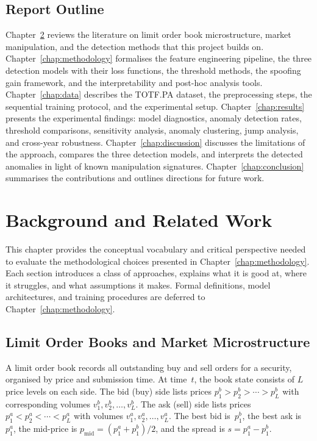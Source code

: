 \documentclass[11pt]{report}
\begin{document}
\section{Report Outline}\label{sec:intro:outline}

Chapter~\ref{chap:background} reviews the literature on limit order book microstructure, market manipulation, and the detection methods that this project builds on.
Chapter~\ref{chap:methodology} formalises the feature engineering pipeline, the three detection models with their loss functions, the threshold methods, the spoofing gain framework, and the interpretability and post-hoc analysis tools.
Chapter~\ref{chap:data} describes the TOTF.PA dataset, the preprocessing steps, the sequential training protocol, and the experimental setup.
Chapter~\ref{chap:results} presents the experimental findings: model diagnostics, anomaly detection rates, threshold comparisons, sensitivity analysis, anomaly clustering, jump analysis, and cross-year robustness.
Chapter~\ref{chap:discussion} discusses the limitations of the approach, compares the three detection models, and interprets the detected anomalies in light of known manipulation signatures.
Chapter~\ref{chap:conclusion} summarises the contributions and outlines directions for future work.


\chapter{Background and Related Work}\label{chap:background}

This chapter provides the conceptual vocabulary and critical perspective needed to evaluate the methodological choices presented in Chapter~\ref{chap:methodology}. Each section introduces a class of approaches, explains what it is good at, where it struggles, and what assumptions it makes. Formal definitions, model architectures, and training procedures are deferred to Chapter~\ref{chap:methodology}.

\section{Limit Order Books and Market Microstructure}\label{sec:background:lob}

A limit order book records all outstanding buy and sell orders for a security, organised by price and submission time. At time~$t$, the book state consists of $L$ price levels on each side. The bid (buy) side lists prices $p^b_1 > p^b_2 > \cdots > p^b_L$ with corresponding volumes $v^b_1, v^b_2, \ldots, v^b_L$. The ask (sell) side lists prices $p^a_1 < p^a_2 < \cdots < p^a_L$ with volumes $v^a_1, v^a_2, \ldots, v^a_L$. The best bid is~$p^b_1$, the best ask is~$p^a_1$, the mid-price is $p_{\text{mid}} = (p^a_1 + p^b_1)/2$, and the spread is $s = p^a_1 - p^b_1$.
\end{document}
